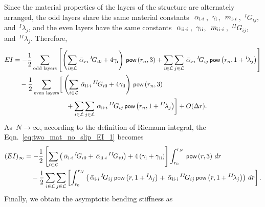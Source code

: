 \documentclass[preprint,12pt,times]{elsarticle}
\numberwithin{equation}{section}
\newcommand{\pr}[1]{\left( #1 \right)}
\newcommand{\p}{\,\textsf{\small pow}}
\newcommand{\msub}[2]{
\IfEqCase{#2}{
      {i}{\, m_{#1\cdot #2}\,}%
  }[\,m_{#1\cdot {\scriptscriptstyle #2}}\,]}
\newcommand{\alphasub}[2]{
\IfEqCase{#2}{
		{i}{\,\alpha_{ {#1}\cdot { \scriptstyle #2}}\,}%
	}[\,\alpha_{ {#1}\cdot {\scriptscriptstyle #2}}\,]}
\newcommand{\alphaBARsub}[2]{
\IfEqCase{#2}{
        {i}{\,\bar{\alpha}_{ {#1}\cdot { \scriptstyle #2}}\,}%
    }[\,\bar{\alpha}_{ {#1}\cdot {\scriptscriptstyle #2}}\,]}
\newcommand{\RN}[1]{%
  \textup{\uppercase\expandafter{\romannumeral#1}}%
}
\renewcommand{\>}{$\Rightarrow$}
\begin{document}
Since the material properties of the layers of the structure are alternately arranged, the odd layers share the same material constants~$\alphasub{\RN{1}}{i}$,~$\gamma_{\RN{1}}$,~$\msub{\RN{1}}{i}$,~${}^{I}\!G_{ij}$, and~${}^{I}\!\lambda_{j}$, and the even layers have the same constants~$\alphasub{\RN{2}}{i}$,~$\gamma_{\RN{2}}$,~$\msub{\RN{2}}{i}$,~${}^{II}\!G_{ij}$, and~${}^{II}\!\lambda_{j}$. Therefore,
\begin{equation}
\begin{aligned}
	EI & =  - \frac{1}{2} \sum_{\text{odd layers}} \left[ \left( \sum_{i \in \mathcal{L}} \alphaBARsub{\RN{1}}{i} {}^{I}\!G_{i0} + 4\gamma_{\RN{1}} \right) \p\pr{r_{n},3}+ \sum_{i \in \mathcal{L}} \sum_{j \in \mathcal{L}} \alphaBARsub{\RN{1}}{i} {}^{I}\!G_{ij} \p\pr{r_{n},1 + {}^{I}\!\lambda_{j}} \right] \\
	 & \quad - \frac{1}{2} \sum_{\text{even layers}} \biggr[ \left( \sum_{i \in \mathcal{L}} \alphaBARsub{\RN{2}}{i} {}^{II}\!G_{i0} + 4\gamma_{\RN{2}} \right) \p\pr{r_{n},3} \\
	  & \qquad \qquad \qquad \qquad + \sum_{i \in \mathcal{L}} \sum_{j \in \mathcal{L}} \alphaBARsub{\RN{2}}{i} {}^{II}\!G_{ij} \p\pr{r_{n},1 + {}^{II}\!\lambda_{j}} \biggr] + O(\Delta r).
\end{aligned}
\label{eq:two_mat_no_slip_EI_1}
\end{equation}
As~$N \to \infty$, according to the definition of Riemann integral, the Eqn.~\eqref{eq:two_mat_no_slip_EI_1} becomes
\begin{equation*}
\begin{aligned}
	(EI)_{\infty} & =  - \frac{1}{2} \left[ \sum_{i \in \mathcal{L}} \left( \alphaBARsub{\RN{1}}{i} {}^{I}\!G_{i0} + \alphaBARsub{\RN{2}}{i} {}^{II}\!G_{i0} \right) + 4\left( \gamma_{\RN{1}} +\gamma_{\RN{2}} \right) \right] \int_{r_{0}}^{r_{N}} \p\pr{r,3} \, dr \\
	& \quad - \frac{1}{2} \sum_{i \in \mathcal{L}} \sum_{j \in \mathcal{L}} \left[ \int_{r_{0}}^{r_{N}} \left( \alphaBARsub{\RN{1}}{i} {}^{I}\!G_{ij} \p\pr{r,1 + {}^{I}\!\lambda_{j}} + \alphaBARsub{\RN{2}}{i} {}^{II}\!G_{ij}  \p\pr{r,1 + {}^{II}\!\lambda_{j}} \right) \, dr \right] .
\end{aligned}
\label{eq:two_mat_no_slip_EI_2}
\end{equation*}
Finally, we obtain the asymptotic bending stiffness as
\end{document}
